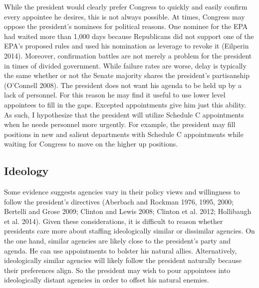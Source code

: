 \documentclass[12pt]{article}
\begin{document}

While the president would clearly prefer Congress to quickly and easily confirm every appointee he desires, this is not always possible. At times, Congress may oppose the president's nominees for political reasons. One nominee for the EPA had waited more than 1,000 days because Republicans did not support one of the EPA's proposed rules and used his nomination as leverage to revoke it (Eilperin 2014). Moreover, confirmation battles are not merely a problem for the president in times of divided government. While failure rates are worse, delay is typically the same whether or not the Senate majority shares the president's partisanship (O'Connell 2008). The president does not want his agenda to be held up by a lack of personnel. For this reason he may find it useful to use lower level appointees to fill in the gaps. Excepted appointments give him just this ability. As such, I hypothesize that the president will utilize Schedule C appointments when he needs personnel more urgently. For example, the president may fill positions in new and salient departments with Schedule C appointments while waiting for Congress to move on the higher up positions.

\subsection*{Ideology}

Some evidence suggests agencies vary in their policy views and willingness to follow the president's directives (Aberbach and Rockman 1976, 1995, 2000; Bertelli and Grose 2009; Clinton and Lewis 2008; Clinton et al. 2012; Hollibaugh et al. 2014). Given these considerations, it is difficult to reason whether presidents care more about staffing ideologically similar or dissimilar agencies. On the one hand, similar agencies are likely close to the president's party and agenda. He can use appointments to bolster his natural allies. Alternatively, ideologically similar agencies will likely follow the president naturally because their preferences align. So the president may wish to pour appointees into ideologically distant agencies in order to offset his natural enemies. 

\end{document}
